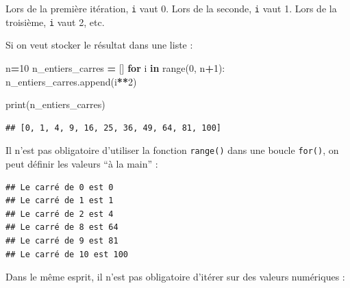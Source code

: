 \documentclass[12pt,]{book}
\newenvironment{Shaded}{\begin{snugshade}}{\end{snugshade}}
\newcommand{\KeywordTok}[1]{\textcolor[rgb]{0.13,0.29,0.53}{\textbf{#1}}}
\newcommand{\DecValTok}[1]{\textcolor[rgb]{0.00,0.00,0.81}{#1}}
\newcommand{\SpecialCharTok}[1]{\textcolor[rgb]{0.00,0.00,0.00}{#1}}
\newcommand{\StringTok}[1]{\textcolor[rgb]{0.31,0.60,0.02}{#1}}
\newcommand{\ControlFlowTok}[1]{\textcolor[rgb]{0.13,0.29,0.53}{\textbf{#1}}}
\newcommand{\OperatorTok}[1]{\textcolor[rgb]{0.81,0.36,0.00}{\textbf{#1}}}
\newcommand{\BuiltInTok}[1]{#1}
\newcommand{\NormalTok}[1]{#1}
\numberwithin{equation}{section}
\numberwithin{countremarque}{section}
\begin{document}
Lors de la première itération, \texttt{i} vaut 0. Lors de la seconde,
\texttt{i} vaut 1. Lors de la troisième, \texttt{i} vaut 2, etc.

Si on veut stocker le résultat dans une liste :

\begin{Shaded}
\begin{Highlighting}[]
\NormalTok{n}\OperatorTok{=}\DecValTok{10}
\NormalTok{n_entiers_carres }\OperatorTok{=}\NormalTok{ []}
\ControlFlowTok{for}\NormalTok{ i }\KeywordTok{in} \BuiltInTok{range}\NormalTok{(}\DecValTok{0}\NormalTok{, n}\OperatorTok{+}\DecValTok{1}\NormalTok{):}
\NormalTok{  n_entiers_carres.append(i}\OperatorTok{**}\DecValTok{2}\NormalTok{)}
  
\BuiltInTok{print}\NormalTok{(n_entiers_carres)}
\end{Highlighting}
\end{Shaded}

\begin{lstlisting}
## [0, 1, 4, 9, 16, 25, 36, 49, 64, 81, 100]
\end{lstlisting}

Il n'est pas obligatoire d'utiliser la fonction \texttt{range()} dans
une boucle \texttt{for()}, on peut définir les valeurs ``à la main'' :

\begin{Shaded}
\end{Shaded}

\begin{lstlisting}
## Le carré de 0 est 0
## Le carré de 1 est 1
## Le carré de 2 est 4
## Le carré de 8 est 64
## Le carré de 9 est 81
## Le carré de 10 est 100
\end{lstlisting}

Dans le même esprit, il n'est pas obligatoire d'itérer sur des valeurs
numériques :

\begin{Shaded}
\end{Shaded}
\end{document}
